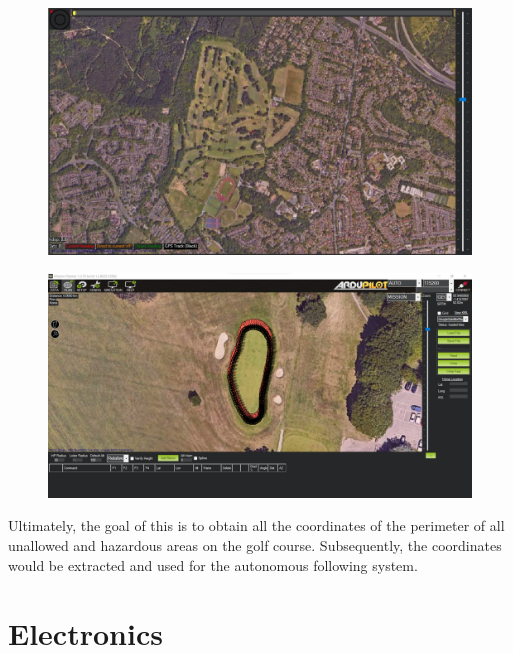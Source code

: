 \documentclass[11pt,landscape]{article}
\begin{document}
\begin{multicols}{3}
\begin{figure}[H]
    \begin{center}
        \includegraphics[]{Municipal.png}
    \end{center}
    \label{fig:mission_planer}
\end{figure}

\begin{figure}[H]
    \begin{center}
        \includegraphics[]{polygon 1.png}
    \end{center}
    \label{fig:polygon1}
\end{figure}

Ultimately, the goal of this is to obtain all the coordinates of the perimeter
of all unallowed and hazardous areas on the golf course. Subsequently, the
coordinates would be extracted and used for the autonomous following system.


\section{Electronics}
\label{electronics}

\end{multicols}
\end{document}
